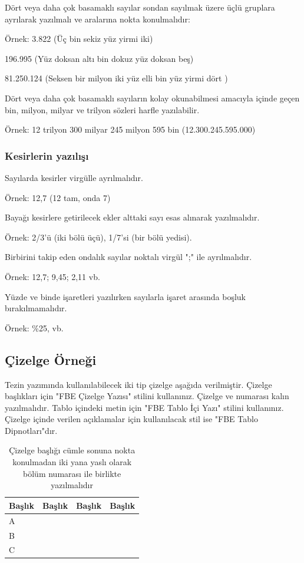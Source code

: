 Dört veya daha çok basamaklı sayılar sondan sayılmak üzere üçlü gruplara ayrılarak yazılmalı ve aralarına nokta konulmalıdır:

Örnek: 3.822 (Üç bin sekiz yüz yirmi iki)

196.995 (Yüz doksan altı bin dokuz yüz doksan beş)

81.250.124 (Seksen bir milyon iki yüz elli bin yüz yirmi dört )

Dört veya daha çok basamaklı sayıların kolay okunabilmesi amacıyla içinde geçen bin, milyon, milyar ve trilyon sözleri harfle yazılabilir.

Örnek: 12 trilyon 300 milyar 245 milyon 595 bin (12.300.245.595.000)


\subsubsection{Kesirlerin yazılışı}
\noindent Sayılarda kesirler virgülle ayrılmalıdır.

Örnek: 12,7 (12 tam, onda 7)

Bayağı kesirlere getirilecek ekler alttaki sayı esas alınarak yazılmalıdır.

Örnek: 2/3’ü (iki bölü üçü), 1/7’si (bir bölü yedisi).

Birbirini takip eden ondalık sayılar noktalı virgül ";" ile ayrılmalıdır.

Örnek: 12,7; 9,45; 2,11 vb.

Yüzde ve binde işaretleri yazılırken sayılarla işaret arasında boşluk bırakılmamalıdır.

Örnek: \%25,  vb.


\subsection{Çizelge Örneği}
\noindent Tezin yazımında kullanılabilecek iki tip çizelge aşağıda verilmiştir. Çizelge başlıkları için "FBE Çizelge Yazısı" stilini kullanınız. Çizelge ve numarası kalın yazılmalıdır. Tablo içindeki metin için "FBE Tablo İçi Yazı" stilini kullanınız. Çizelge içinde verilen açıklamalar için kullanılacak stil ise "FBE Tablo Dipnotları"dır.

\begin{table}[!t]
	\caption{Çizelge başlığı cümle sonuna nokta konulmadan iki yana yaslı olarak bölüm numarası ile birlikte yazılmalıdır}
	\begin{tabular}{L{3cm}L{3cm}L{3cm}L{3cm}}
		\hline\hline
		Başlık&Başlık&Başlık&Başlık\\\hline
	A&&&\\
	B&&&\\
	C&&&\\
	\hline\hline
	\end{tabular}
\vspace{24pt}
\end{table}


